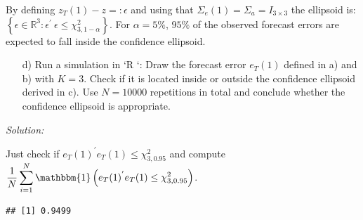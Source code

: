 \documentclass[12pt,a4paper]{article}
\newenvironment{Shaded}{\begin{snugshade}}{\end{snugshade}}
\newcommand{\CommentTok}[1]{\textcolor[rgb]{0.56,0.35,0.01}{\textit{#1}}}
\newcommand{\DataTypeTok}[1]{\textcolor[rgb]{0.13,0.29,0.53}{#1}}
\newcommand{\DecValTok}[1]{\textcolor[rgb]{0.00,0.00,0.81}{#1}}
\newcommand{\FloatTok}[1]{\textcolor[rgb]{0.00,0.00,0.81}{#1}}
\newcommand{\KeywordTok}[1]{\textcolor[rgb]{0.13,0.29,0.53}{\textbf{#1}}}
\newcommand{\NormalTok}[1]{#1}
\newcommand{\OperatorTok}[1]{\textcolor[rgb]{0.81,0.36,0.00}{\textbf{#1}}}
\newcommand{\OtherTok}[1]{\textcolor[rgb]{0.56,0.35,0.01}{#1}}
\newcommand{\StringTok}[1]{\textcolor[rgb]{0.31,0.60,0.02}{#1}}
\begin{document}
By defining \(z_T (1) - z =: \epsilon\) and using that
\(\Sigma_e (1) = \Sigma_a = I_{3 \times 3}\) the ellipsoid is:
\(\left\{ \epsilon \in \mathbb{R}^{3}: \epsilon^{'} \ \epsilon \leq \chi_{3, 1- \alpha}^{2}\right\}\).
For \(\alpha = 5 \%\), \(95 \%\) of the observed forecast errors are
expected to fall inside the confidence ellipsoid.

\begin{itemize}
  \item[d)] Run a simulation in `R `: Draw the forecast error $e_T (1)$ defined in a) and b) with $K = 3$. Check if it is located inside or outside the confidence ellipsoid derived in c). Use $N = 10 000$ repetitions in total and conclude whether the confidence ellipsoid is appropriate.  
\end{itemize}

\emph{Solution:}

Just check if \(e_T (1)^{'} e_T (1) \leq \chi_{3, 0.95}^{2}\) and
compute
\(\displaystyle \dfrac{1}{N} \sum_{i = 1}^{N} \mathbbm{1} \left( e_T (1)^{'} e_T (1) \leq \chi_{3, 0.95}^{2}\right)\).

\begin{Shaded}
\end{Shaded}

\begin{verbatim}
## [1] 0.9499
\end{verbatim}
\end{document}
